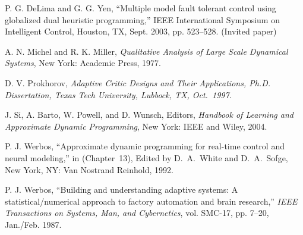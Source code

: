 \begin{thebibliography}{1}
 P. G. DeLima and G. G. Yen, 
``Multiple model fault tolerant control using globalized dual 
heuristic programming,''
{\Pot IEEE International Symposium on Intelligent Control}, 
Houston, TX, Sept. 2003, pp. 523--528. (Invited paper) 
                                        
 A. N. Michel and R. K. Miller,
        {\it Qualitative Analysis of Large Scale Dynamical Systems},
        New York: Academic Press, 1977.
	 
  D. V. Prokhorov, \it Adaptive Critic Designs and
    Their Applications\rm  , Ph.D. Dissertation, Texas Tech University,
     Lubbock, TX, Oct.~1997.

 J. Si, A. Barto, W. Powell, and D. Wunsch, Editors,
	{\it Handbook of Learning and Approximate Dynamic Programming}, 
        New York: IEEE and Wiley, 2004.
                                           
 P. J. Werbos, ``Approximate dynamic programming for
    real-time control  and neural modeling,'' in
        \handb (Chapter~13), Edited by D.~A.~White
    and D.~A.~Sofge, New York, NY: Van Nostrand Reinhold, 1992.
                                        
 P. J. Werbos,
``Building and understanding adaptive systems: A statistical/numerical
approach to factory automation and brain research,''
{\it IEEE Transactions on Systems, Man, and Cybernetics},
vol. SMC-17, pp. 7--20, Jan./Feb. 1987.

\end{thebibliography}
